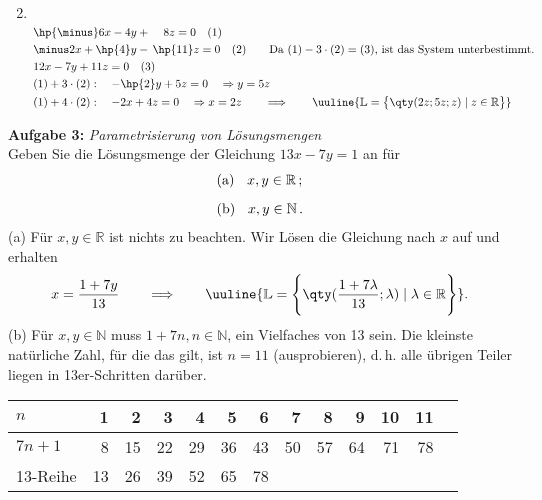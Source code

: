\begin{enumerate}[label=(\alph*)]
\begin{align*}
    \end{align*}
    \newpage
    \item $~$\\[-1.45cm] 
    \begin{align*}
        &\hp{\minus}6x-4y+\;\;\;\;8z=0\quad (1) \\
        &\minus2x+\hp{4}y-\,\hp{11}z=0\quad (2) \qquad \text{Da $(1)-3\cdot(2)=(3)$, ist das System unterbestimmt.}\\
        &12x-7y+11z=0\quad(3)\\
        &(1)+3\cdot(2): \quad -\hp{2}y+5z = 0 \quad \Rightarrow y=5z \\
        &(1)+4\cdot(2): \quad -2x+4z=0 \quad \Rightarrow x=2z \qquad \Longrightarrow \qquad \uuline{\mathbb{L} = \big\{\qty(2z;5z;z)\mid z\in\mathbb{R}\big\}
        }
    \end{align*}
\end{enumerate}

% 
\textbf{Aufgabe 3: } \emph{Parametrisierung von Lösungsmengen}\\[0.2cm]
Geben Sie die Lösungsmenge der Gleichung $13x-7y=1$ an für
\begin{align*}
&\text{(a) } \hspace{0.2cm} x,y\in\mathbb{R}\,;\\[0.2cm]
&\text{(b) } \hspace{0.2cm} x,y\in\mathbb{N}\,.
\end{align*}
(a) Für $x,y \in \mathbb{R}$ ist nichts zu beachten. Wir Lösen die Gleichung nach $x$ auf und erhalten 
\begin{align*}
    x = \frac{1+7y}{13} \qquad \Longrightarrow \qquad \uuline{\mathbb{L} = \Bigg\{\qty(\frac{1+7\lambda}{13};\lambda)\mid \lambda \in\mathbb{R}\Bigg\}}.
\end{align*}
(b) Für $x,y \in \mathbb{N}$ muss $1+7n, n\in\mathbb{N}$, ein Vielfaches von 13 sein. Die kleinste natürliche Zahl, für die das gilt, ist $n=11$ (ausprobieren), d.\,h. alle übrigen Teiler liegen in 13er-Schritten darüber.
\begin{table}[htp]
    \centering
    \begin{tabular}{l r r r r r r r r r r r r}
        \toprule 
        $n$ & 1 & 2 & 3 & 4 & 5 & 6 & 7 & 8 & 9 & 10 & 11\\
        \midrule
        $7n+1$ & 8 & 15 & 22 & 29 & 36 & 43 & 50 & 57 & 64 & 71 & 78 \\
        13-Reihe & 13 & 26 & 39 & 52 & 65 & 78 
    \end{tabular}
\end{table}

